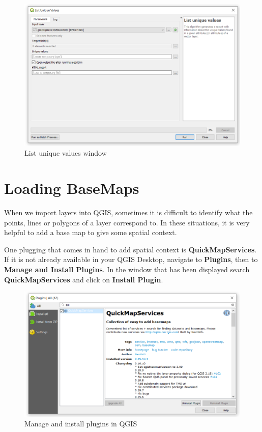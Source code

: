 \documentclass[]{book}
\theoremstyle{definition}
\theoremstyle{definition}
\theoremstyle{definition}
\theoremstyle{remark}
\begin{document}
\begin{figure}

{\centering \includegraphics[width=14.79in]{figures/List_Unique_Values} 

}

\caption{List unique values window}\label{fig:unnamed-chunk-22}
\end{figure}

\section{Loading BaseMaps}\label{basemaps}

When we import layers into QGIS, sometimes it is difficult to identify
what the points, lines or polygons of a layer correspond to. In these
situations, it is very helpful to add a base map to give some spatial
context.

One plugging that comes in hand to add spatial context is
\textbf{QuickMapServices}. If it is not already available in your QGIS
Desktop, navigate to \textbf{Plugins}, then to \textbf{Manage and
Install Plugins}. In the window that has been displayed search
\textbf{QuickMapServices} and click on \textbf{Install Plugin}.

\begin{figure}

{\centering \includegraphics[width=14.35in]{figures/QuickMapServices} 

}

\caption{Manage and install plugins in QGIS}\label{fig:unnamed-chunk-23}
\end{figure}
\end{document}

